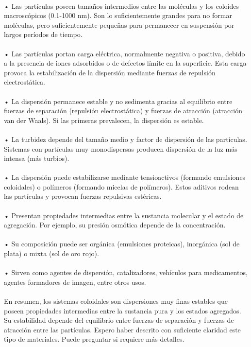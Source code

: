 \documentclass{article}
\begin{document}
\begin{itemize}
\\
• Las partículas poseen tamaños intermedios entre las moléculas y los coloides macroscópicos (0.1-1000 nm). Son lo suficientemente grandes para no formar moléculas, pero suficientemente pequeñas para permanecer en suspensión por largos períodos de tiempo.\\
\\
• Las partículas portan carga eléctrica, normalmente negativa o positiva, debido a la presencia de iones adsorbidos o de defectos límite en la superficie. Esta carga provoca la estabilización de la dispersión mediante fuerzas de repulsión electrostática.\\
\\
• La dispersión permanece estable y no sedimenta gracias al equilibrio entre fuerzas de separación (repulsión electrostática) y fuerzas de atracción (atracción van der Waals). Si las primeras prevalecen, la dispersión es estable.\\
\\
• La turbidez depende del tamaño medio y factor de dispersión de las partículas. Sistemas con partículas muy monodispersas producen dispersión de la luz más intensa (más turbios).\\
\\
• La dispersión puede estabilizarse mediante tensioactivos (formando emulsiones coloidales) o polímeros (formando micelas de polímeros). Estos aditivos rodean las partículas y provocan fuerzas repulsivas estéricas.\\
\\
• Presentan propiedades intermedias entre la sustancia molecular y el estado de agregación. Por ejemplo, su presión osmótica depende de la concentración.\\
\\
• Su composición puede ser orgánica (emulsiones proteicas), inorgánica (sol de plata) o mixta (sol de oro rojo).\\
\\
• Sirven como agentes de dispersión, catalizadores, vehículos para medicamentos, agentes formadores de imagen, entre otros usos.\\
\\
En resumen, los sistemas coloidales son dispersiones muy finas estables que poseen propiedades intermedias entre la sustancia pura y los estados agregados. Su estabilidad depende del equilibrio entre fuerzas de separación y fuerzas de atracción entre las partículas. Espero haber descrito con suficiente claridad este tipo de materiales. Puede preguntar si requiere más detalles.\\

\end{itemize}
\end{document}
